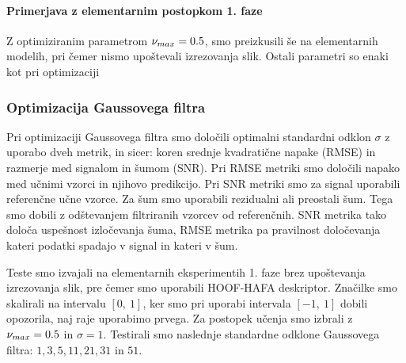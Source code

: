 \paragraph{Primerjava z elementarnim postopkom 1. faze}
Z optimiziranim parametrom $\nu_{max}=0.5$, smo \nurbf preizkusili še na elementarnih modelih, pri čemer nismo upoštevali izrezovanja slik. Ostali parametri so enaki kot pri optimizaciji



\subsubsection{Optimizacija Gaussovega filtra}
Pri optimizaciji Gaussovega filtra smo določili optimalni standardni odklon $\sigma$ z uporabo dveh metrik, in sicer: koren srednje kvadratične napake (RMSE) in razmerje med signalom in šumom (SNR). Pri RMSE metriki smo določili napako med učnimi vzorci in njihovo predikcijo. Pri SNR metriki smo za signal uporabili referenčne učne vzorce. Za šum smo uporabili rezidualni ali preostali šum. Tega smo dobili z odštevanjem filtriranih vzorcev od referenčnih. SNR metrika tako določa uspešnost izločevanja šuma, RMSE metrika pa pravilnost določevanja kateri podatki spadajo v signal in kateri v šum.

Teste smo izvajali na elementarnih eksperimentih 1. faze brez upoštevanja izrezovanja slik, pre čemer smo uporabili HOOF-HAFA deskriptor. Značilke smo skalirali na intervalu $[0,~1]$, ker smo pri uporabi intervala $[-1,~1]$ dobili opozorila, naj raje uporabimo prvega. Za postopek učenja smo izbrali \nurbf z $\nu_{max}=0.5$ in $\sigma = 1$. Testirali smo naslednje standardne odklone Gaussovega filtra: $1, 3, 5, 11, 21, 31$ in $51$. 


